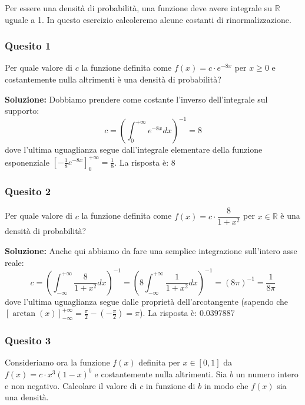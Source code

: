 \documentclass[12pt, a4paper]{article}
\begin{document}
\begin{tcolorbox}[colback=lightergray!10, colframe=tocsec, title=\textbf{Esercizio 1}]
Per essere una densità di probabilità, una funzione deve avere integrale su $\mathbb{R}$ uguale a 1. In questo esercizio calcoleremo alcune costanti di rinormalizzazione.
\end{tcolorbox}

\subsubsection*{Quesito 1}
Per quale valore di $c$ la funzione definita come $f(x)=c \cdot e^{-8x}$ per $x \geq 0$ e costantemente nulla altrimenti è una densità di probabilità?

\textbf{Soluzione:}
Dobbiamo prendere come costante l'inverso dell'integrale sul supporto:
$$ c = \left(\int_0^{+\infty} e^{-8x} dx\right)^{-1} = 8 $$
dove l’ultima uguaglianza segue dall’integrale elementare della funzione esponenziale $\left[ -\frac{1}{8} e^{-8x} \right]_0^{+\infty} = \frac{1}{8}$.
La risposta è: 8

\subsubsection*{Quesito 2}
Per quale valore di $c$ la funzione definita come $f(x)=c \cdot \dfrac{8}{1+x^2}$ per $x \in \mathbb{R}$ è una densità di probabilità?

\textbf{Soluzione:}
Anche qui abbiamo da fare una semplice integrazione sull'intero asse reale:
$$ c = \left(\int_{-\infty}^{+\infty} \frac{8}{1+x^2} dx\right)^{-1} = \left(8 \int_{-\infty}^{+\infty} \frac{1}{1+x^2} dx\right)^{-1} = (8\pi)^{-1} = \frac{1}{8\pi} $$
dove l’ultima uguaglianza segue dalle proprietà dell’arcotangente (sapendo che $\left[ \arctan(x) \right]_{-\infty}^{+\infty} = \frac{\pi}{2} - \left(-\frac{\pi}{2}\right) = \pi$).
La risposta è: 0.0397887

\subsubsection*{Quesito 3}
Consideriamo ora la funzione $f(x)$ definita per $x \in [0,1]$ da $f(x)=c \cdot x^3(1-x)^b$ e costantemente nulla altrimenti. Sia $b$ un numero intero e non negativo. Calcolare il valore di $c$ in funzione di $b$ in modo che $f(x)$ sia una densità.
\end{document}
